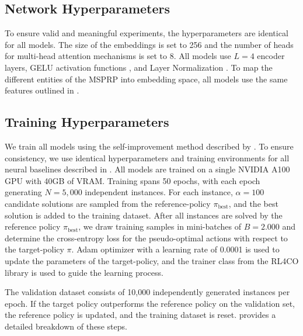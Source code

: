 \subsection{Network Hyperparameters}
\label{appendix:network}
To ensure valid and meaningful experiments, the hyperparameters are identical for all models. The size of the embeddings is set to 256 and the number of heads for multi-head attention mechanisms is set to 8. All models use $L=4$ encoder layers, GELU activation functions \cite{hendrycks2016gaussian}, and Layer Normalization \cite{ba2016layernormalization}. To map the different entities of the MSPRP into embedding space, all models use the same features outlined in .



\subsection{Training Hyperparameters}
\label{appendix:training}
We train all models using the self-improvement method described by \cite{pirnay2024selfimprovement}. To ensure consistency, we use identical hyperparameters and training environments for all neural baselines described in . All models are trained on a single NVIDIA A100 GPU with 40GB of VRAM. Training spans 50 epochs, with each epoch generating $N=5,000$ independent instances. For each instance, $\alpha=100$ candidate solutions are sampled from the reference-policy $\pi_{\text{best}}$, and the best solution is added to the training dataset.
After all instances are solved by the reference policy $\pi_{\text{best}}$, we draw training samples in mini-batches of $B=2.000$ and determine the cross-entropy loss for the pseudo-optimal actions with respect to the target-policy $\pi$. Adam optimizer with a learning rate of 0.0001 is used to update the parameters of the target-policy, and the trainer class from the RL4CO \cite{berto2023rl4co} library is used to guide the learning process.  

The validation dataset consists of 10,000 independently generated instances per epoch. If the target policy outperforms the reference policy on the validation set, the reference policy is updated, and the training dataset is reset.  provides a detailed breakdown of these steps.

